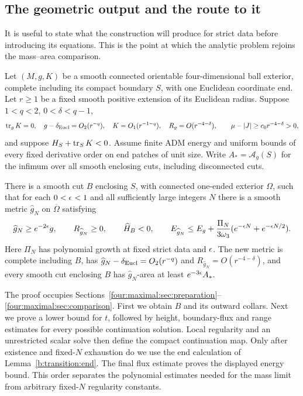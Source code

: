 \subsection{The geometric output and the route to it}

It is useful to state what the construction will produce for strict
data before introducing its equations.  This is the point at which
the analytic problem rejoins the mass--area comparison.

\begin{proposition}
\label{four:maximal:prop:geometric-output}
Let $(M,g,K)$ be a smooth connected orientable four-dimensional
ball exterior, complete including its compact boundary $S$, with one
Euclidean coordinate end.  Let $r\ge1$ be a fixed smooth positive
extension of its Euclidean radius.  Suppose $1<q<2$, $0<\delta<q-1$,
\[
 \operatorname{tr}_gK=0,\quad g-\delta_{\rm Eucl}=O_2(r^{-q}),\quad
 K=O_1(r^{-1-q}),\quad R_g=O(r^{-4-\delta}),
 \qquad \mu-|J|\ge c_0r^{-4-\delta}>0,
\]
and suppose $H_S+\operatorname{tr}_SK<0$.  Assume finite ADM energy and uniform
bounds of every fixed derivative order on end patches of unit size.
Write $A_* =\mathcal A_g(S)$ for the infimum over all smooth enclosing
cuts, including disconnected cuts.

There is a smooth cut $B$ enclosing $S$, with connected one-ended
exterior $\Omega$, such that for each $0<\epsilon<1$ and all sufficiently
large integers $N$ there is a smooth metric $\widehat g_N$ on
$\overline\Omega$ satisfying
\[
 \widehat g_N\ge e^{-2\epsilon}g,\qquad
 R_{\widehat g_N}\ge0,\qquad \widehat H_B<0,
 \qquad
 E_{\widehat g_N}\le E_g+
       \frac{\Pi_N}{3\omega_3}
            (e^{-\epsilon N}+e^{-\epsilon N/2}).
\]
Here $\Pi_N$ has polynomial growth at fixed strict data and $\epsilon$.
The new metric is complete including $B$, has
$\widehat g_N-\delta_{\rm Eucl}=O_2(r^{-q})$ and
$R_{\widehat g_N}=O(r^{-4-\delta})$, and every smooth cut enclosing
$B$ has $\widehat g_N$-area at least $e^{-3\epsilon}A_*$.
\end{proposition}

The proof occupies Sections~\ref{four:maximal:sec:preparation}--
\ref{four:maximal:sec:comparison}.  First we obtain $B$ and its outward
collars.  Next we prove a lower bound for $t$, followed by height,
boundary-flux and range estimates for every possible continuation
solution.  Local regularity and an unrestricted scalar solve then
define the compact continuation map.  Only after existence and
fixed-$N$ exhaustion do we use the end calculation of
Lemma~\ref{b:transition:end}.  The final flux estimate proves the
displayed energy bound.  This order separates the polynomial estimates
needed for the mass limit from arbitrary fixed-$N$ regularity constants.

